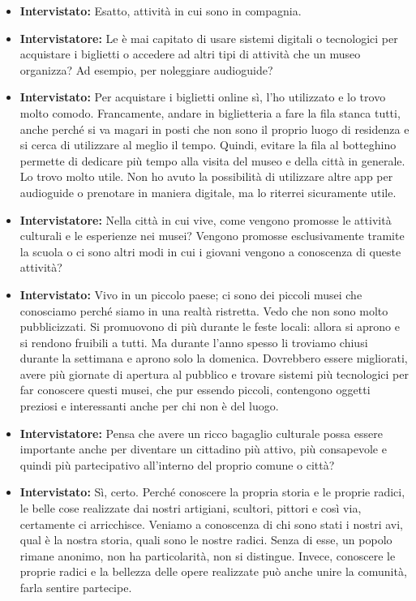 \documentclass{article}
\begin{document}
\begin{itemize}
    \item \textbf{Intervistato:} Esatto, attività in cui sono in compagnia.
    
    \item \textbf{Intervistatore:} Le è mai capitato di usare sistemi digitali o tecnologici per acquistare i biglietti o accedere ad altri tipi di attività che un museo organizza? Ad esempio, per noleggiare audioguide?
    
    \item \textbf{Intervistato:} Per acquistare i biglietti online sì, l’ho utilizzato e lo trovo molto comodo. Francamente, andare in biglietteria a fare la fila stanca tutti, anche perché si va magari in posti che non sono il proprio luogo di residenza e si cerca di utilizzare al meglio il tempo. Quindi, evitare la fila al botteghino permette di dedicare più tempo alla visita del museo e della città in generale. Lo trovo molto utile. Non ho avuto la possibilità di utilizzare altre app per audioguide o prenotare in maniera digitale, ma lo riterrei sicuramente utile.
    
    \item \textbf{Intervistatore:} Nella città in cui vive, come vengono promosse le attività culturali e le esperienze nei musei? Vengono promosse esclusivamente tramite la scuola o ci sono altri modi in cui i giovani vengono a conoscenza di queste attività?
    
    \item \textbf{Intervistato:} Vivo in un piccolo paese; ci sono dei piccoli musei che conosciamo perché siamo in una realtà ristretta. Vedo che non sono molto pubblicizzati. Si promuovono di più durante le feste locali: allora si aprono e si rendono fruibili a tutti. Ma durante l’anno spesso li troviamo chiusi durante la settimana e aprono solo la domenica. Dovrebbero essere migliorati, avere più giornate di apertura al pubblico e trovare sistemi più tecnologici per far conoscere questi musei, che pur essendo piccoli, contengono oggetti preziosi e interessanti anche per chi non è del luogo.
    
    \item \textbf{Intervistatore:} Pensa che avere un ricco bagaglio culturale possa essere importante anche per diventare un cittadino più attivo, più consapevole e quindi più partecipativo all’interno del proprio comune o città?
    
    \item \textbf{Intervistato:} Sì, certo. Perché conoscere la propria storia e le proprie radici, le belle cose realizzate dai nostri artigiani, scultori, pittori e così via, certamente ci arricchisce. Veniamo a conoscenza di chi sono stati i nostri avi, qual è la nostra storia, quali sono le nostre radici. Senza di esse, un popolo rimane anonimo, non ha particolarità, non si distingue. Invece, conoscere le proprie radici e la bellezza delle opere realizzate può anche unire la comunità, farla sentire partecipe.
    

\end{itemize}
\end{document}
